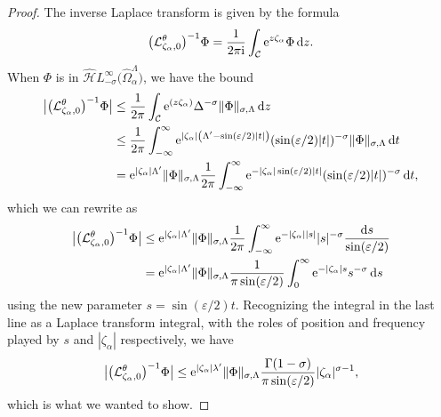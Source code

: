 \documentclass[10pt,a4paper]{amsart}
\let\Re\relax
\DeclareMathOperator{\Re}{Re}
\newcommand{\dualsingexp}[1]{\widehat{\mathcal{H}}L^\infty_{#1}}
\newcommand{\laplace}{\mathcal{L}}
\numberwithin{equation}{section}
\begin{document}
\begin{proof}
The inverse Laplace transform is given by the formula
\[ \bigl(\laplace_{\zeta_\alpha, 0}^\theta\bigr)^{-1} \Phi = \frac{1}{2 \pi {\rm i}} \int_{\mathcal{C}} {\rm e}^{z\zeta_\alpha} \Phi\,{\rm d}z. \]
When $\Phi$ is in $\dualsingexp{-\sigma}\bigl(\widehat{\Omega}_\alpha^\Lambda\bigr)$, we have the bound
\begin{align*}
\big|\bigl(\laplace_{\zeta_\alpha, 0}^\theta\bigr)^{-1} \Phi\big| & \le \frac{1}{2 \pi} \int_{\mathcal{C}} {\rm e}^{\Re(z\zeta_\alpha)} \Delta^{-\sigma} \|\Phi\|_{\sigma, \Lambda}\,{\rm d}z \\
& \le \frac{1}{2 \pi} \int_{-\infty}^\infty {\rm e}^{|\zeta_\alpha| \left(\Lambda' - \sin(\varepsilon/2) |t|\right)} (\sin(\varepsilon/2) |t|)^{-\sigma} \|\Phi\|_{\sigma, \Lambda} \,{\rm d}t \\
& = {\rm e}^{|\zeta_\alpha| \Lambda'} \|\Phi\|_{\sigma, \Lambda} \frac{1}{2 \pi} \int_{-\infty}^\infty {\rm e}^{-|\zeta_\alpha| \sin(\varepsilon/2) |t|} (\sin(\varepsilon/2) |t|)^{-\sigma}\, {\rm d}t,
\end{align*}
which we can rewrite as
\begin{align*}
\big|\bigl(\laplace_{\zeta_\alpha, 0}^\theta\bigr)^{-1} \Phi\big| & \le {\rm e}^{|\zeta_\alpha| \Lambda'} \|\Phi\|_{\sigma, \Lambda} \frac{1}{2 \pi} \int_{-\infty}^\infty {\rm e}^{-|\zeta_\alpha| |s|} |s|^{-\sigma} \frac{{\rm d}s}{\sin(\varepsilon/2)} \\
& = {\rm e}^{|\zeta_\alpha| \Lambda'} \|\Phi\|_{\sigma, \Lambda} \frac{1}{\pi \sin(\varepsilon/2)} \int_0^\infty {\rm e}^{-|\zeta_\alpha|s} s^{-\sigma}\,{\rm d}s
\end{align*}
using the new parameter $s = \sin(\varepsilon/2) t$. Recognizing the integral in the last line as a Laplace transform integral, with the roles of position and frequency played by $s$ and $|\zeta_\alpha|$ respectively, we have
\[ \big|\bigl(\laplace_{\zeta_\alpha, 0}^\theta\bigr)^{-1} \Phi\big| \le {\rm e}^{|\zeta_\alpha| \lambda'} \|\Phi\|_{\sigma, \Lambda} \frac{\Gamma(1-\sigma)}{\pi \sin(\varepsilon/2)} |\zeta_\alpha|^{\sigma-1}, \]
which is what we wanted to show.
\end{proof}
\end{document}
